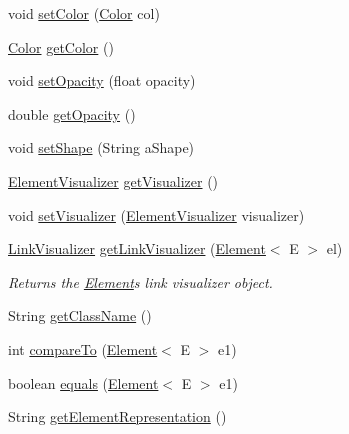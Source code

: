 \begin{DoxyCompactItemize}
\item 
void \hyperlink{classbridges_1_1base_1_1_element_aeb3336746d41a180e50b5efaff2dedc2}{set\+Color} (\hyperlink{classbridges_1_1base_1_1_color}{Color} col)
\item 
\hyperlink{classbridges_1_1base_1_1_color}{Color} \hyperlink{classbridges_1_1base_1_1_element_a6b80259f4f23b30df5486bf70f17c3b8}{get\+Color} ()
\item 
void \hyperlink{classbridges_1_1base_1_1_element_a71c622f2cbb03b086c5a8f80d390b366}{set\+Opacity} (float opacity)
\item 
double \hyperlink{classbridges_1_1base_1_1_element_a1427af7efc2d5bc93e00a6a95d268c4d}{get\+Opacity} ()
\item 
void \hyperlink{classbridges_1_1base_1_1_element_ae65bfb47628e028c21c43553ef59b7a2}{set\+Shape} (String a\+Shape)
\item 
\hyperlink{classbridges_1_1base_1_1_element_visualizer}{Element\+Visualizer} \hyperlink{classbridges_1_1base_1_1_element_a42c84d41dfb7bd05a586e303cb33de72}{get\+Visualizer} ()
\item 
void \hyperlink{classbridges_1_1base_1_1_element_a5befa95788099f1bc72cdf5361c55bed}{set\+Visualizer} (\hyperlink{classbridges_1_1base_1_1_element_visualizer}{Element\+Visualizer} visualizer)
\item 
\hyperlink{classbridges_1_1base_1_1_link_visualizer}{Link\+Visualizer} \hyperlink{classbridges_1_1base_1_1_element_a7978552c7b36e28c302f611fc1958e7f}{get\+Link\+Visualizer} (\hyperlink{classbridges_1_1base_1_1_element}{Element}$<$ E $>$ el)
\begin{DoxyCompactList}\small\item\em Returns the \hyperlink{classbridges_1_1base_1_1_element}{Element}\textquotesingle{}s link visualizer object. \end{DoxyCompactList}\item 
String \hyperlink{classbridges_1_1base_1_1_element_aa235244426486921bef319a28616bf8b}{get\+Class\+Name} ()
\item 
int \hyperlink{classbridges_1_1base_1_1_element_a6cd4c4f15c6a4f87f59e443cffe87a20}{compare\+To} (\hyperlink{classbridges_1_1base_1_1_element}{Element}$<$ E $>$ e1)
\item 
boolean \hyperlink{classbridges_1_1base_1_1_element_aff10d60700eb1aceca5c0b519bdccccb}{equals} (\hyperlink{classbridges_1_1base_1_1_element}{Element}$<$ E $>$ e1)
\item 
String \hyperlink{classbridges_1_1base_1_1_element_a8822450cfaf8495bc955d777ad35ea3f}{get\+Element\+Representation} ()

\end{DoxyCompactItemize}
